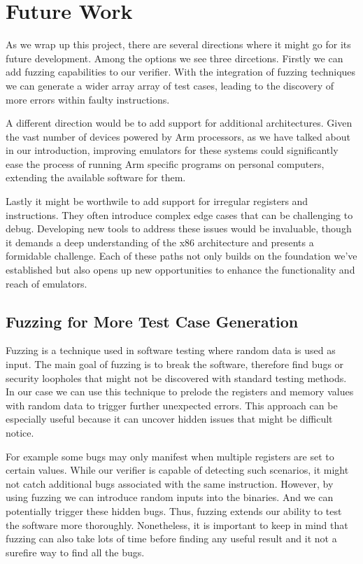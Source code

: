 
\chapter{Future Work}\label{chapter:future_work}
As we wrap up this project, there are several directions where it might go for its future development.
Among the options we see three dircetions.
Firstly we can add fuzzing capabilities to our verifier.
With the integration of fuzzing techniques we can generate a wider array array of test cases, leading to the discovery of more errors within faulty instructions.

A different direction would be to add support for additional architectures.
Given the vast number of devices powered by Arm processors, as we have talked about in our introduction, improving emulators for these systems could significantly ease the process of running Arm specific programs on personal computers, extending the available software for them.

Lastly it might be worthwile to add support for irregular registers and instructions.
They often introduce complex edge cases that can be challenging to debug.
Developing new tools to address these issues would be invaluable, though it demands a deep understanding of the x86 architecture and presents a formidable challenge.
Each of these paths not only builds on the foundation we've established but also opens up new opportunities to enhance the functionality and reach of emulators.

\section{Fuzzing for More Test Case Generation}
Fuzzing is a technique used in software testing where random data is used as input.
The main goal of fuzzing is to break the software, therefore find bugs or security loopholes that might not be discovered with standard testing methods. 
In our case we can use this technique to prelode the registers and memory values with random data to trigger further unexpected errors.
This approach can be especially useful because it can uncover hidden issues that might be difficult notice.

For example some bugs may only manifest when multiple registers are set to certain values.
While our verifier is capable of detecting such scenarios, it might not catch additional bugs associated with the same instruction.
However, by using fuzzing we can introduce random inputs into the binaries.
And we can potentially trigger these hidden bugs.
Thus, fuzzing extends our ability to test the software more thoroughly.
Nonetheless, it is important to keep in mind that fuzzing can also take lots of time before finding any useful result and it not a surefire way to find all the bugs.

